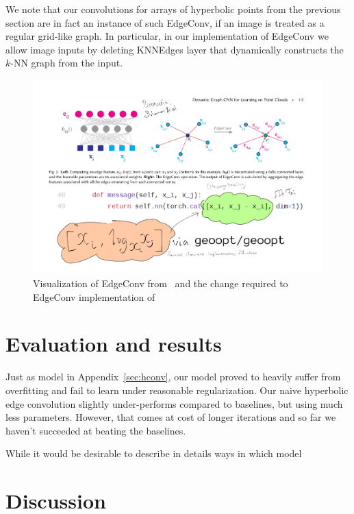 We note that our convolutions for arrays of hyperbolic points from the previous
section are in fact an instance of such EdgeConv, if an image is treated as a
regular grid-like graph. In particular, in our implementation of EdgeConv we
allow image inputs by deleting \textrm{KNNEdges} layer that dynamically
constructs the \( k \)-NN graph from the input.

\begin{figure}[H]\center
\includegraphics[width=.75\textwidth]{art/hyperbolic-edgeconv.pdf}
\caption{
    Visualization of EdgeConv from~\citet{edgeconv} and the change
        required to EdgeConv implementation of~\citet{pytorchGeometric}
}
\end{figure}

\section{Evaluation and results} \label{sec:results}

Just as model in Appendix~\autoref{sec:hconv}, our model proved to heavily
suffer from overfitting and fail to learn under reasonable regularization.  Our
naive hyperbolic edge convolution slightly under-performs compared to
baselines, but using much less parameters. However, that comes at cost of
longer iterations and so far we haven't succeeded at beating the baselines.

While it would be desirable to describe in details ways in which model

\section{Discussion} \label{sec:discussion}

